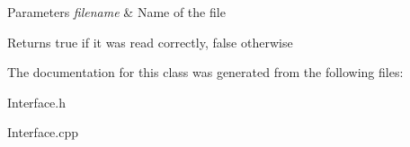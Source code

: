 \begin{DoxyParams}{Parameters}
{\em filename} & Name of the file \\
\hline
\end{DoxyParams}
\begin{DoxyReturn}{Returns}
true if it was read correctly, false otherwise 
\end{DoxyReturn}


The documentation for this class was generated from the following files\+:\begin{DoxyCompactItemize}
\item 
Interface.\+h\item 
Interface.\+cpp\end{DoxyCompactItemize}

